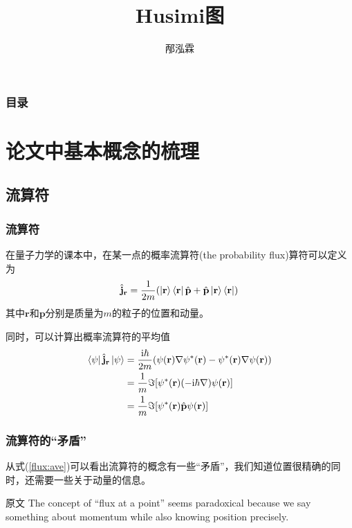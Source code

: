 \documentclass[UTF8]{beamer}
\title{Husimi图}
\author{邴泓霖}
\begin{document}
\frame{\titlepage}
\begin{frame}\frametitle{目录}
    \tableofcontents
\end{frame}
%
\section{论文中基本概念的梳理}
\subsection{流算符}
\begin{frame}\frametitle{流算符}
    在量子力学的课本中，在某一点的概率流算符(the probability flux)算符可以定义为
    \begin{equation}
        \hat{\mathbf{j}}_{\mathbf{r}} = \frac{1}{2m}(\ket{\mathbf{r}}\bra{\mathbf{r}}\hat{\mathbf{p}}+\hat{\mathbf{p}}\ket{\mathbf{r}}\bra{\mathbf{r}})           
        \label{flux:def}
    \end{equation}
    其中$\mathbf{r}$和$\mathbf{p}$分别是质量为$m$的粒子的位置和动量。
    
    同时，可以计算出概率流算符的平均值
    \begin{equation}
        \begin{aligned}
            \bra{\psi}\hat{\mathbf{j}}_{\mathbf{r}}\ket{\psi}&=
            \frac{\mathrm{i}\hbar}{2m}(
            \mathrm{\psi}(\mathbf{r})\nabla\mathrm{\psi}^{*}(\mathbf{r})
            -\mathrm{\psi}^{*}(\mathbf{r})\nabla\mathrm{\psi}(\mathbf{r})
            )\\
            &=\frac{1}{m}\Im[\mathrm{\psi}^{*}(\mathbf{r})(-\mathrm{i}\hbar\nabla)\mathrm{\psi}(\mathbf{r})]\\ 
            &=\frac{1}{m}\Im[\mathrm{\psi}^{*}(\mathbf{r})\hat{\mathbf{p}}\mathrm{\psi}(\mathbf{r})]
            \label{flux:ave}
        \end{aligned}
    \end{equation}
\end{frame}
\begin{frame}\frametitle{流算符的“矛盾”}
    从式(\ref{flux:ave})可以看出流算符的概念有一些“矛盾”，我们知道位置很精确的同时，还需要一些关于动量的信息。\\
    \begin{block}{原文}
        The concept of “flux at a point” seems paradoxical because we say something about momentum while also knowing position precisely.
    \end{block}
\end{frame}
\end{document}
